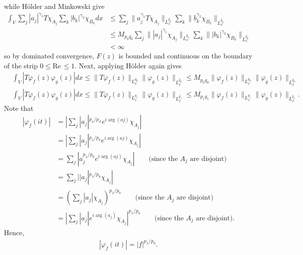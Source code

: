 \documentclass[12pt,reqno]{amsart}
\numberwithin{equation}{section}  %
\numberwithin{figure}{section}
\newcommand{\vp}{\varphi}
\theoremstyle{plain}
\theoremstyle{definition}
\theoremstyle{remark}
\begin{document}
%
%
while H\"older and Minkowski give
%
%
\begin{equation*}
\begin{split}
	\int_{V} \sum_{j} | a_j |^{\gamma_1} T \chi_{A_j}
	\sum_{k} | b_k |^{\gamma_2} \chi_{B_k} dx
	& \le \sum_{j} \| a_j^{\gamma_1} T
	\chi_{A_j}\|_{L_x^{q_0}}  \sum_{k} \|  b_k^{\gamma_2} \chi_{B_k}
	\|_{L_x^{\tilde{q_0}}} 
	\\
	& \le M_{p_0 q_0}\sum_{j} \|| a_j |^{\gamma_1} 
	\chi_{A_j}\|_{L_x^{p_0}}  \sum_{k} \| | b_k |^{\gamma_2} \chi_{B_k}
	\|_{L_x^{\tilde{q_0}}} 
	\\
	& < \infty
\end{split}
\end{equation*}
%
%
so by dominated convergence, $F(z)$ is bounded and continuous on the boundary of
the strip $0 \le \text{Re}\, \le 1$. Next, applying H\"older again gives
%
%
\begin{equation}
\label{key-duality-est}
\begin{split}
	& \int_{V} | T \vp_{f}(z) \vp_{g}(z) | dx 
	\le  \|T \vp_{f}(z)\|_{L_x^{q_0}} \|\vp_{g}(z)\|_{L_x^{\tilde{q_0}}}
	\le M_{p_0 q_0} \|\vp_{f}(z)\|_{L_x^{p_0}} \|\vp_{g}(z)\|_{L_x^{\tilde{q_0}}}
	\\
	& \int_{V} | T \vp_{f}(z) \vp_{g}(z) | dx
	\le  \|T \vp_{f}(z)\|_{L_x^{q_1}} \|\vp_{g}(z)\|_{L_x^{\tilde{q_1}}}
	\le M_{p_1 q_1} \|\vp_{f}(z)\|_{L_x^{p_1}} \|\vp_{g}(z)\|_{L_x^{\tilde{q_1}}}.
\end{split}
\end{equation}
Note that
%
%
\begin{equation*}
\begin{split}
	| \vp_f(it) |
	& = | \sum_{j}| a_j |^{p_\lambda / p_{it}} e^{i \arg(aj)}
	\chi_{A_j} |
	\\
	& = | \sum_{j}| a_j |^{p_\lambda / p_0} e^{i \arg(aj)}
	\chi_{A_j} |
	\\
	& =  \sum_{j}| a_j^{p_\lambda / p_0} e^{i \arg(aj)}
	\chi_{A_j} | \qquad \text{(since the $A_j$ are disjoint)}
	\\
	& = \sum_{j}| |a_j|^{p_\lambda / p_0}
	\chi_{A_j} | 
	\\
	& = \left( \sum_{j} | a_j | \chi_{A_j} \right)^{p_\lambda / p_0}
	\qquad \text{(since the $A_j$ are disjoint)}
	\\
	& = | \sum_{j} | a_j |e^{i \arg(a_j)} \chi_{A_j} |^{p_\lambda / p_0}
	\qquad \text{(since the $A_j$ are disjoint)}.
\end{split}
\end{equation*}
Hence, 
\begin{equation}
	\label{modulus-1}
\begin{split}
	| \vp_f(it) |
	= | f |^{p_\lambda / p_0}.
\end{split}
\end{equation}
\end{document}
